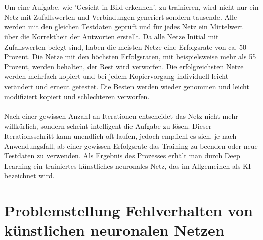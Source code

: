 \documentclass[12pt,oneside,a4paper,parskip]{scrbook}
\begin{document}
\\\\
Um eine Aufgabe, wie 'Gesicht in Bild erkennen', zu trainieren, wird nicht nur ein Netz mit Zufallswerten und Verbindungen generiert sondern tausende. Alle werden mit den gleichen Testdaten geprüft und für jedes Netz ein Mittelwert über die Korrektheit der Antworten erstellt. Da alle Netze Initial mit Zufallswerten belegt sind, haben die meisten Netze eine Erfolgsrate von ca. 50 Prozent. Die Netze mit den höchsten Erfolgsraten, mit beispielsweise mehr als 55 Prozent, werden behalten, der Rest wird verworfen. Die erfolgreichsten Netze werden mehrfach kopiert und bei jedem Kopiervorgang individuell leicht verändert und erneut getestet. Die Besten werden wieder genommen und leicht modifiziert kopiert und schlechteren verworfen. 
\\\\
Nach einer gewissen Anzahl an Iterationen entscheidet das Netz nicht mehr willkürlich, sondern scheint intelligent die Aufgabe zu lösen. Dieser Iterationsschritt kann unendlich oft laufen, jedoch empfiehl es sich, je nach Anwendungsfall, ab einer gewissen Erfolgsrate das Training zu beenden oder neue Testdaten zu verwenden. Als Ergebnis des Prozesses erhält man durch Deep Learning ein trainiertes künstliches neuronales Netz, das im Allgemeinen als KI bezeichnet wird.


\chapter{Problemstellung Fehlverhalten von künstlichen neuronalen Netzen}
\end{document}
